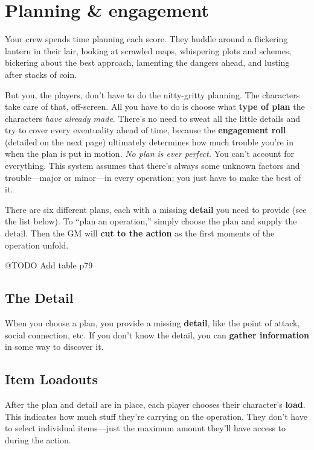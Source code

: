 \documentclass[11pt,fleqn,a5paper]{book}
\begin{document}
\chapter{Planning \& engagement}

Your crew spends time planning each score. They huddle around a flickering lantern in their lair, looking at scrawled maps, whispering plots and schemes, bickering about the best approach, lamenting the dangers ahead, and lusting after stacks of coin.

But you, the players, don’t have to do the nitty-gritty planning. The characters take care of that, off-screen. All you have to do is choose what \textbf{type of plan} the characters \emph{have already made}. There’s no need to sweat all the little details and try to cover every eventuality ahead of time, because the \textbf{engagement roll} (detailed on the next page) ultimately determines how much trouble you’re in when the plan is put in motion. \emph{No plan is ever perfect.} You can’t account for everything. This system assumes that there’s always some unknown factors and trouble---major or minor---in every operation; you just have to make the best of it.

There are six different plans, each with a missing \textbf{detail} you need to provide (see the list below). To “plan an operation,” simply choose the plan and supply the detail. Then the GM will \textbf{cut to the action} as the first moments of the operation unfold.

@TODO Add table p79

\section{The Detail}

When you choose a plan, you provide a missing \textbf{detail}, like the point of attack, social connection, etc. If you don’t know the detail, you can \textbf{gather information} in some way to discover it.

\section{Item Loadouts}

After the plan and detail are in place, each player chooses their character’s \textbf{load}. This indicates how much stuff they’re carrying on the operation. They don’t have to select individual items---just the maximum amount they’ll have access to during the action.
\end{document}
